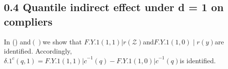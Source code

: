 \documentclass{article}
\begin{document}
\subsection*{0.4 Quantile indirect effect under d = 1 on compliers}


In () and$( )$we show that $F . { Y . { 1 } ( 1, 1 ) | r } ( \mathcal { Z } )$and$F . { Y . { 1 } ( 1, 0 ) \mid r } ( y )$are identified. Accordingly,
$\delta . { 1 } ^ { c } ( q, 1 ) = F . { Y . { 1 } ( 1, 1 ) | c } ^ { - 1 } ( q ) - F . { Y . { 1 } ( 1, 0 ) | c } ^ { - 1 } ( q )$is identified.
\end{document}

